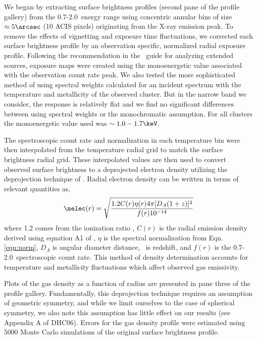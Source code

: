 \documentclass[12pt, preprint]{aastex}
\begin{document}
We began by extracting surface brightness profiles (second pane of the
profile gallery) from the 0.7-2.0\keV\ energy range using concentric
annular bins of size $\approx 5\arcsec$ (10 ACIS pixels) originating from
the X-ray emission peak. To remove the effects of vignetting and
exposure time fluctuations, we corrected each surface brightness
profile by an observation specific, normalized radial exposure
profile. Following the recommendation in the \Ciao\ guide for
analyzing extended sources, exposure maps were created using the
monoenergetic value associated with the observation count rate
peak. We also tested the more sophisticated method of using spectral
weights calculated for an incident spectrum with the temperature and
metallicity of the observed cluster. But in the narrow band we
consider, the response is relatively flat and we find no significant
differences between using spectral weights or the monochromatic
assumption. For all clusters the monoenergetic value used was $\sim
1.0-1.7\keV$.

The spectroscopic count rate and normalization in each temperature bin
were then interpolated from the temperature radial grid to match the
surface brightness radial grid. These interpolated values are then
used to convert observed surface brightness to a deprojected electron
density utilizing the deprojection technique of
\citealt{1983ApJ...272..439K}. Radial electron density can be written
in terms of relevant quantities as,
\begin{equation}
\nelec(r) = \sqrt{\frac{1.2 C(r) \eta(r) 4 \pi [D_A(1+z)]^2}{f(r) 10^{-14}}}
\end{equation}
where 1.2 comes from the ionization ratio \np, $C(r)$ is the
radial emission density derived using equation A1 of
\citealt{1983ApJ...272..439K}, $\eta$ is the spectral normalization from
Eqn. \ref{eqn:norm}, $D_A$ is angular diameter distance, \red\ is
redshift, and $f(r)$ is the 0.7-2.0\keV\ spectroscopic count rate. This
method of density determination accounts for temperature and
metallicity fluctuations which affect observed gas emissivity.

Plots of the gas density as a function of radius are presented in pane
three of the profile gallery. Fundamentally, this deprojection
technique requires an assumption of geometric symmetry, and while we
limit ourselves to the case of spherical symmetry, we also note this
assumption has little effect on our results (see Appendix A of DHC06).
Errors for the gas density profile were estimated using 5000 Monte
Carlo simulations of the original surface brightness profile.
\end{document}
